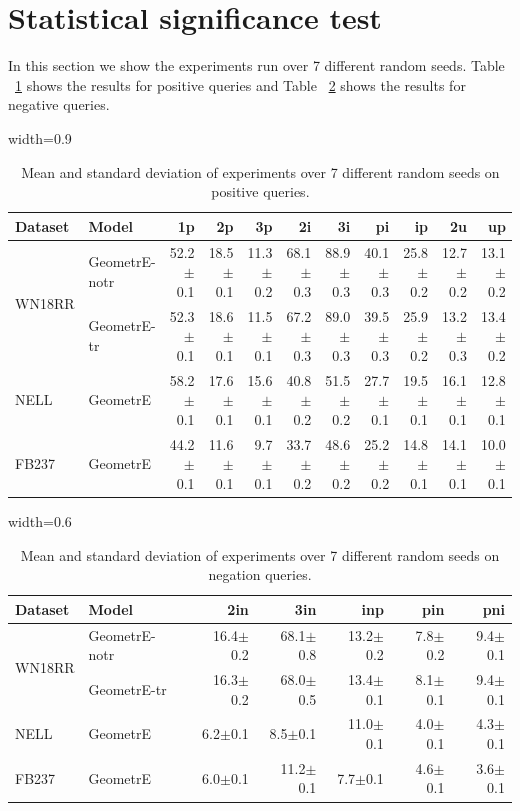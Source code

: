 \documentclass[runningheads]{llncs}
\newcommand{\std}[1]{{\scriptsize $\pm$#1}}
\newcommand{\method}{GeometrE}
\begin{document}
\section{Statistical significance test}
\label{app:stats}
In this section we show the experiments run over 7 different random
seeds. Table ~\ref{tab:stats} shows the results for positive queries
and Table ~\ref{tab:stats_neg} shows the results for negative queries.
\begin{table}[htbp]
  \small
  \centering
  \caption{Mean and standard deviation of experiments over 7 different
  random seeds on positive queries.}
\begin{adjustbox}{width=0.9\textwidth}
  \begin{tabular}{llrrrrrrrrr}
    \toprule
    Dataset&Model&1p&2p&3p&2i&3i&pi&ip&2u&up\\
        \midrule
    \multirow{2}{*}{WN18RR}& \method{}-notr & 52.2\std{0.1} & 18.5\std{0.1} & 11.3\std{0.2} & 68.1\std{0.3} & 88.9\std{0.3} & 40.1\std{0.3} & 25.8\std{0.2} & 12.7\std{0.2} & 13.1\std{0.2}  \\
           & \method{}-tr & 52.3\std{0.1} & 18.6\std{0.1} & 11.5\std{0.1} & 67.2\std{0.3} & 89.0\std{0.3} & 39.5\std{0.3} & 25.9\std{0.2} & 13.2\std{0.3} & 13.4\std{0.2}  \\
    NELL & \method{} & 58.2\std{0.1} & 17.6\std{0.1} & 15.6\std{0.1} & 40.8\std{0.2} & 51.5\std{0.2} & 27.7\std{0.1} & 19.5\std{0.1} & 16.1\std{0.1} & 12.8\std{0.1} \\
           FB237 &  \method{} & 44.2\std{0.1} & 11.6\std{0.1} & 9.7\std{0.1} & 33.7\std{0.2} & 48.6\std{0.2} & 25.2\std{0.2} & 14.8\std{0.1} & 14.1\std{0.1} & 10.0\std{0.1}  \\
    
    \bottomrule
  \end{tabular}
\end{adjustbox}
\label{tab:stats}
\end{table}
\begin{table}[b]
  \small
  \centering
  \caption{Mean and standard deviation of experiments over 7 different
  random seeds on negation queries.}
\begin{adjustbox}{width=0.6\textwidth}
  \begin{tabular}{llrrrrr}
    \toprule
    Dataset&Model&2in&3in&inp&pin&pni\\
    \midrule
    \multirow{2}{*}{WN18RR}&\method{}-notr & 16.4\std{0.2} & 68.1\std{0.8} & 13.2\std{0.2} & 7.8\std{0.2} & 9.4\std{0.1}\\
           &\method{}-tr & 16.3\std{0.2} & 68.0\std{0.5} & 13.4\std{0.1} & 8.1\std{0.1} & 9.4\std{0.1}\\
\midrule
    {NELL}&\method{} & 6.2\std{0.1} & 8.5\std{0.1} & 11.0\std{0.1} & 4.0\std{0.1} & 4.3\std{0.1}  \\
\midrule
    {FB237}&\method{} & 6.0\std{0.1} & 11.2\std{0.1} & 7.7\std{0.1} & 4.6\std{0.1} & 3.6\std{0.1} \\

    

\bottomrule
  \end{tabular}
\end{adjustbox}
\label{tab:stats_neg}
\end{table}
\end{document}
